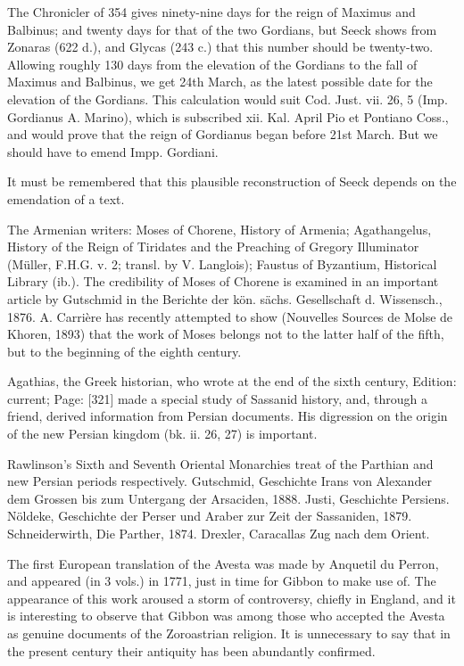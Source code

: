 The Chronicler of 354 gives ninety-nine days for the reign of Maximus and Balbinus; and twenty days for that of the two Gordians, but Seeck shows from Zonaras (622 d.), and Glycas (243 c.) that this number should be twenty-two. Allowing roughly 130 days from the elevation of the Gordians to the fall of Maximus and Balbinus, we get 24th March, as the latest possible date for the elevation of the Gordians. This calculation would suit Cod. Just. vii. 26, 5 (Imp. Gordianus A. Marino), which is subscribed xii. Kal. April Pio et Pontiano Coss., and would prove that the reign of Gordianus began before 21st March. But we should have to emend Impp. Gordiani.

It must be remembered that this plausible reconstruction of Seeck depends on the emendation of a text.


The Armenian writers: Moses of Chorene, History of Armenia; Agathangelus, History of the Reign of Tiridates and the Preaching of Gregory Illuminator (Müller, F.H.G. v. 2; transl. by V. Langlois); Faustus of Byzantium, Historical Library (ib.). The credibility of Moses of Chorene is examined in an important article by Gutschmid in the Berichte der kön. sächs. Gesellschaft d. Wissensch., 1876. A. Carrière has recently attempted to show (Nouvelles Sources de Molse de Khoren, 1893) that the work of Moses belongs not to the latter half of the fifth, but to the beginning of the eighth century.

Agathias, the Greek historian, who wrote at the end of the sixth century, Edition: current; Page: [321] made a special study of Sassanid history, and, through a friend, derived information from Persian documents. His digression on the origin of the new Persian kingdom (bk. ii. 26, 27) is important.

Rawlinson\texthebrew{}’s Sixth and Seventh Oriental Monarchies treat of the Parthian and new Persian periods respectively. Gutschmid, Geschichte Irans von Alexander dem Grossen bis zum Untergang der Arsaciden, 1888. Justi, Geschichte Persiens. Nöldeke, Geschichte der Perser und Araber zur Zeit der Sassaniden, 1879. Schneiderwirth, Die Parther, 1874. Drexler, Caracallas Zug nach dem Orient.


The first European translation of the Avesta was made by Anquetil du Perron, and appeared (in 3 vols.) in 1771, just in time for Gibbon to make use of. The appearance of this work aroused a storm of controversy, chiefly in England, and it is interesting to observe that Gibbon was among those who accepted the Avesta as genuine documents of the Zoroastrian religion. It is unnecessary to say that in the present century their antiquity has been abundantly confirmed.

